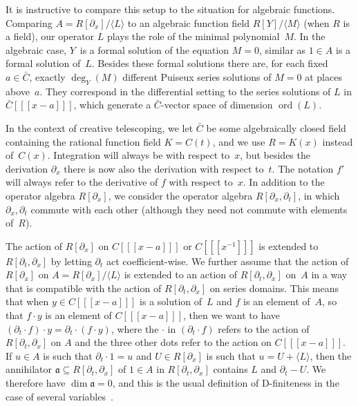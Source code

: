 \documentclass{sig-alternate}
\def\ord{\operatorname{ord}}
\def\<#1>{\langle#1\rangle}
\begin{document}
It is instructive to compare this setup to the situation for algebraic
functions. Comparing $A=R[\partial_x]/\<L>$ to an algebraic function field $R[Y]/\<M>$
(when $R$ is a field), our operator $L$ plays the role of the minimal
polynomial~$M$. In the algebraic case, $Y$~is a formal solution of the equation
$M=0$, similar as $1\in A$ is a formal solution of~$L$. Besides these formal
solutions there are, for each fixed $a\in\bar C$, exactly $\deg_Y(M)$ different
Puiseux series solutions of $M=0$ at places above~$a$. They correspond in the
differential setting to the series solutions of $L$ in $\bar C[[[x-a]]]$, which
generate a $\bar C$-vector space of dimension $\ord(L)$.

In the context of creative telescoping, we let $\bar C$ be some algebraically
closed field containing the rational function field $K=C(t)$, and we
use $R=K(x)$ instead of~$C(x)$. Integration will always be with respect to~$x$, but
besides the derivation $\partial_x$ there is now also the derivation with respect
to~$t$. The notation $f'$ will always refer to the derivative of $f$
with respect to~$x$. In addition to the operator algebra $R[\partial_x]$, we consider the
operator algebra $R[\partial_x,\partial_t]$, in which $\partial_x,\partial_t$
commute with each other (although they need not commute with elements of~$R$).

The action of $R[\partial_x]$ on $C[[[x-a]]]$ or $C[[[x^{-1}]]]$ is extended
to $R[\partial_t,\partial_x]$ by letting $\partial_t$ act coefficient-wise.
We further assume that the action of $R[\partial_x]$ on $A=R[\partial_x]/\<L>$ is
extended to an action of $R[\partial_t,\partial_x]$ on~$A$ in a way that is
compatible with the action of $R[\partial_t,\partial_x]$ on series domains.
This means that when $y\in C[[[x-a]]]$ is a solution of~$L$ and $f$ is an
element of~$A$, so that $f\cdot y$ is an element of $C[[[x-a]]]$, then we
want to have $(\partial_t\cdot f)\cdot y=\partial_t\cdot(f\cdot y)$, where
the $\cdot$ in $(\partial_t\cdot f)$ refers to the action of $R[\partial_t,\partial_x]$
on $A$ and the three other dots refer to the action on $C[[[x-a]]]$.
If $u\in A$ is such that $\partial_t\cdot 1 = u$ and $U\in R[\partial_x]$ is such
that $u=U+\<L>$, then the annihilator $\mathfrak{a}\subseteq R[\partial_t,\partial_x]$
of $1\in A$ in $R[\partial_t,\partial_x]$ contains $L$ and $\partial_t-U$. We
therefore have $\dim\mathfrak{a}=0$, and this is the usual
definition of D-finiteness in the case of several variables~\cite{Zeilberger1990,chyzak98,koutschan09,kauers14c}.
\end{document}
